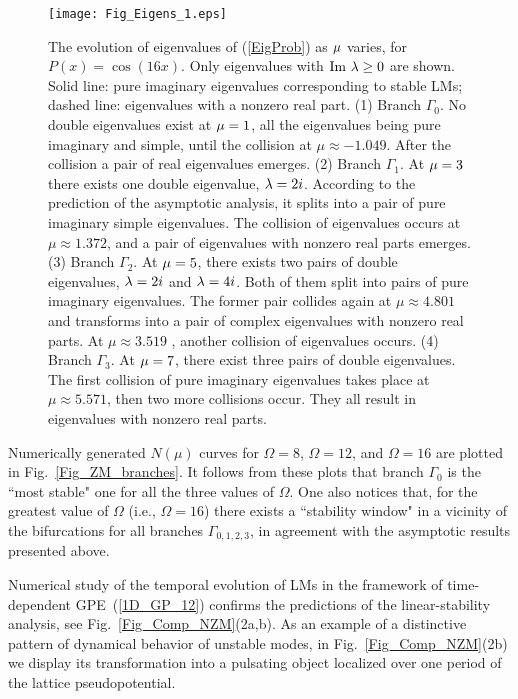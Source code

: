 \documentclass[aps,preprint,showkeys,
]{revtex4}
\begin{document}
\begin{figure}[tbp]
\texttt{[image: Fig\_Eigens\_1.eps]}%
\caption{The evolution of eigenvalues of (\protect\ref{EigProb}) as $\protect%
\mu $ varies, for $P(x)=\cos \left( 16x\right) $. Only eigenvalues with $%
\mathrm{Im}~\protect\lambda \geq 0$ are shown. Solid line: pure imaginary
eigenvalues corresponding to stable LMs; dashed line: eigenvalues with a
nonzero real part. (1) Branch $\Gamma _{0}$. No double eigenvalues exist at $%
\protect\mu =1$, all the eigenvalues being pure imaginary and simple, until
the collision at $\mu\approx -1.049$. After the collision a
pair of real eigenvalues emerges. (2) Branch $\Gamma _{1}$. At $\protect\mu %
=3$ there exists one double eigenvalue, $\protect\lambda =2i$. According to
the prediction of the asymptotic analysis, it splits into a pair of pure
imaginary simple eigenvalues. The collision of eigenvalues occurs at
$\mu\approx 1.372$, and a pair of eigenvalues with nonzero
real parts emerges. (3) Branch $\Gamma _{2}$. At $\protect\mu =5$, there
exists two pairs of double eigenvalues, $\protect\lambda =2i$ and $\protect%
\lambda =4i$. Both of them split into pairs of pure imaginary eigenvalues.
The former pair collides again at $\mu\approx 4.801$ and
transforms into a pair of complex eigenvalues with nonzero real parts. At
$\mu\approx 3.519$ , another collision of eigenvalues
occurs. (4) Branch $\Gamma _{3}$. At $\protect\mu =7$, there exist three
pairs of double eigenvalues. The first collision of pure imaginary
eigenvalues takes place at $\mu\approx 5.571$, then two more
collisions occur. They all result in eigenvalues with nonzero real parts.}
\label{CollEig}
\end{figure}

Numerically generated $N(\mu )$ curves for $\Omega =8$, $\Omega =12$, and $%
\Omega =16$ are plotted in Fig.~\ref{Fig_ZM_branches}. It follows from these
plots that branch $\Gamma _{0}$ is the ``most
stable" one for all the three values of $\Omega $. One
also notices that, for the greatest value of $\Omega $ (i.e., $\Omega =16$)
there exists a ``stability window" in a
vicinity of the bifurcations for all branches $\Gamma _{0,1,2,3}$, in
agreement with the asymptotic results presented above.

Numerical study of the temporal evolution of LMs in the framework of
time-dependent GPE~(\ref{1D_GP_12}) confirms the predictions of the
linear-stability analysis, see Fig.~\ref{Fig_Comp_NZM}(2a,b).
As an example of a distinctive pattern of dynamical behavior of unstable
modes, in Fig.~\ref{Fig_Comp_NZM}(2b) we display its transformation into a
pulsating object localized over one period of the lattice pseudopotential.
\end{document}
